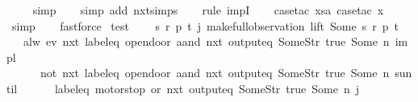 \begin{isabellebody}
\ \ \ \isamarkupfalse%
\ simp\isanewline
\ \ \isamarkupfalse%
\ {\isacharparenleft}simp\ add{\isacharcolon}\ nxt{\isachardot}simps{\isacharparenright}\isanewline
\ \ \isamarkupfalse%
\ {\isacharparenleft}rule\ impI{\isacharparenright}\isanewline
\ \ \isamarkupfalse%
\ {\isacharparenleft}case{\isacharunderscore}tac\ {\isachardoublequoteopen}xsa{\isachardoublequoteclose}{\isacharcomma}\ case{\isacharunderscore}tac\ x{}{\isacharparenright}\isanewline
\ \ \isamarkupfalse%
\ simp\isanewline
\ \ \isamarkupfalse%
\ fastforce%
\endisatagproof
{\isafoldproof}%
%
\isadelimproof
\isanewline
%
\endisadelimproof
\isanewline
{}\isamarkupfalse%
\ test\ {\isacharcolon}\isanewline
\ \ \ {\isachardoublequoteopen}{\isasymexists}s\ r\ p\ t{\isachardot}\ j{\isacharequal}\ make{\isacharunderscore}full{\isacharunderscore}observation\ lift\ {\isacharparenleft}Some\ s{\isacharparenright}\ r\ p\ t{\isachardoublequoteclose}\isanewline
\ \ \ {\isachardoublequoteopen}alw\ {\isacharparenleft}{\isacharparenleft}ev\ {\isacharparenleft}nxt\ {\isacharparenleft}{\isacharparenleft}label{\isacharunderscore}eq\ {\isacharprime}{\isacharprime}opendoor{\isacharprime}{\isacharprime}{\isacharparenright}\ aand\ {\isacharparenleft}nxt\ {\isacharparenleft}output{\isacharunderscore}eq\ {\isacharbrackleft}Some{\isacharparenleft}Str\ {\isacharprime}{\isacharprime}true{\isacharprime}{\isacharprime}{\isacharparenright}{\isacharcomma}\ Some\ n{\isacharbrackright}{\isacharparenright}{\isacharparenright}{\isacharparenright}{\isacharparenright}{\isacharparenright}\ impl\isanewline
\ \ \ \ \ \ {\isacharparenleft}{\isacharparenleft}not\ {\isacharparenleft}nxt\ {\isacharparenleft}{\isacharparenleft}label{\isacharunderscore}eq\ {\isacharprime}{\isacharprime}opendoor{\isacharprime}{\isacharprime}{\isacharparenright}\ aand\ {\isacharparenleft}nxt\ {\isacharparenleft}output{\isacharunderscore}eq\ {\isacharbrackleft}Some{\isacharparenleft}Str\ {\isacharprime}{\isacharprime}true{\isacharprime}{\isacharprime}{\isacharparenright}{\isacharcomma}\ Some\ n{\isacharbrackright}{\isacharparenright}{\isacharparenright}{\isacharparenright}{\isacharparenright}{\isacharparenright}\ suntil\isanewline
\ \ \ \ \ \ {\isacharparenleft}{\isacharparenleft}{\isacharparenleft}label{\isacharunderscore}eq\ {\isacharprime}{\isacharprime}motorstop{\isacharprime}{\isacharprime}{\isacharparenright}\ or\ {\isacharparenleft}nxt\ {\isacharparenleft}output{\isacharunderscore}eq\ {\isacharbrackleft}Some{\isacharparenleft}Str\ {\isacharprime}{\isacharprime}true{\isacharprime}{\isacharprime}{\isacharparenright}{\isacharcomma}\ Some\ n{\isacharbrackright}{\isacharparenright}{\isacharparenright}{\isacharparenright}{\isacharparenright}{\isacharparenright}{\isacharparenright}\ j{\isachardoublequoteclose}\isanewline

\end{isabellebody}
